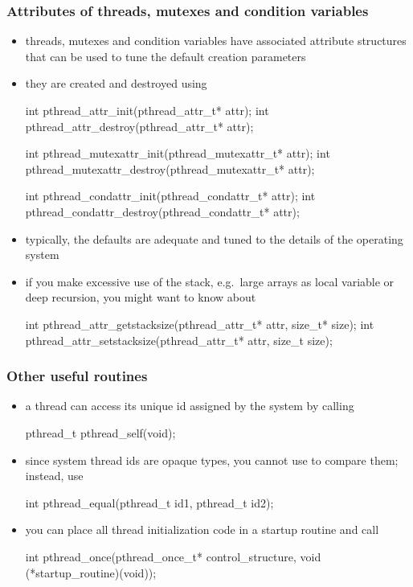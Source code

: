 \begin{frame}[fragile]
%
  \frametitle{Attributes of threads, mutexes and condition variables}
%
  \begin{itemize}
%
  \item threads, mutexes and condition variables have associated attribute structures that can
    be used to tune the default creation parameters
%
  \item they are created and destroyed using
%
    \begin{C}
int pthread_attr_init(pthread_attr_t* attr);
int pthread_attr_destroy(pthread_attr_t* attr);

int pthread_mutexattr_init(pthread_mutexattr_t* attr);
int pthread_mutexattr_destroy(pthread_mutexattr_t* attr);

int pthread_condattr_init(pthread_condattr_t* attr);
int pthread_condattr_destroy(pthread_condattr_t* attr);
    \end{C}
%
  \item typically, the defaults are adequate and tuned to the details of the operating system
%
  \item if you make excessive use of the stack, e.g.~large arrays as local variable or deep
    recursion, you might want to know about
%
    \begin{C}
int pthread_attr_getstacksize(pthread_attr_t* attr, size_t* size);
int pthread_attr_setstacksize(pthread_attr_t* attr, size_t size);
    \end{C}
%
  \end{itemize}
%
\end{frame}

\begin{frame}[fragile]
%
  \frametitle{Other useful routines}
%
  \begin{itemize}
%
  \item a thread can access its unique id assigned by the system by calling 
%
    \begin{C}
pthread_t pthread_self(void);
    \end{C}
%
  \item since system thread ids are opaque types, you cannot use \operator{==} to compare
    them; instead, use
%
    \begin{C}
int pthread_equal(pthread_t id1, pthread_t id2);
    \end{C}
%
  \item you can place all thread initialization code in a startup routine and call
%
    \begin{C}
int pthread_once(pthread_once_t* control_structure, void (*startup_routine)(void));
    \end{C}
%
  \end{itemize}
%
\end{frame}

